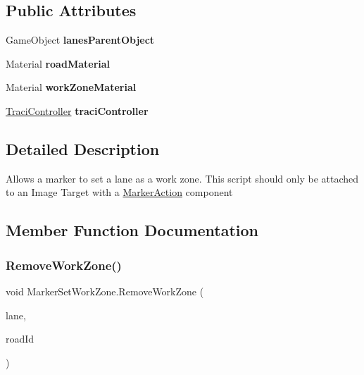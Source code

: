 \subsection*{Public Attributes}
\begin{DoxyCompactItemize}
\item 
\mbox{\label{class_marker_set_work_zone_a089c81ea1e5862a2805ee245fda657b8}} 
Game\+Object {\bfseries lanes\+Parent\+Object}
\item 
\mbox{\label{class_marker_set_work_zone_adf38e479deec47dd3a3cf31d7128cf05}} 
Material {\bfseries road\+Material}
\item 
\mbox{\label{class_marker_set_work_zone_a2356c67a9d2a70d64054998b113b3f93}} 
Material {\bfseries work\+Zone\+Material}
\item 
\mbox{\label{class_marker_set_work_zone_a1948c5a10f441ce2c64f01431cac4723}} 
\mbox{\hyperlink{class_traci_controller}{Traci\+Controller}} {\bfseries traci\+Controller}
\end{DoxyCompactItemize}


\subsection{Detailed Description}
Allows a marker to set a lane as a work zone. This script should only be attached to an Image Target with a \mbox{\hyperlink{class_marker_action}{Marker\+Action}} component 



\subsection{Member Function Documentation}
\mbox{\label{class_marker_set_work_zone_a5837be3e42404f7b224c4b6db403700e}} 
\subsubsection{\texorpdfstring{RemoveWorkZone()}{RemoveWorkZone()}}
{\footnotesize\ttfamily void Marker\+Set\+Work\+Zone.\+Remove\+Work\+Zone (\begin{DoxyParamCaption}\item[{Game\+Object}]{lane,  }\item[{string}]{road\+Id }\end{DoxyParamCaption})}



